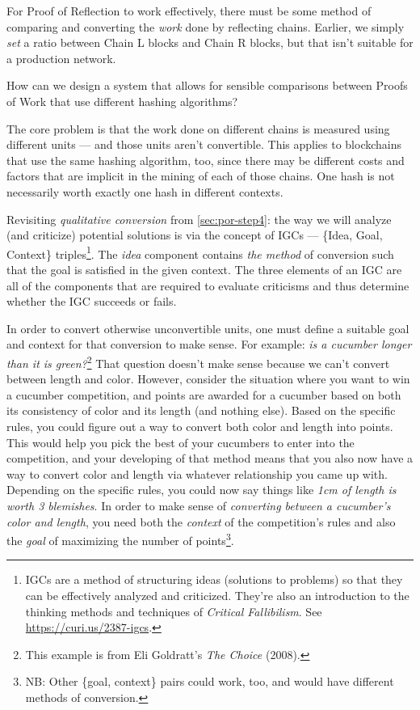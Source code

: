
For Proof of Reflection to work effectively, there must be some method
of comparing and converting the \emph{work} done by reflecting chains.
Earlier, we simply \emph{set} a ratio between Chain L blocks and Chain R
blocks, but that isn't suitable for a production network.

How can we design a system that allows for sensible comparisons between
Proofs of Work that use different hashing algorithms?

The core problem is that the work done on different chains is measured
using different units --- and those units aren't convertible. This
applies to blockchains that use the same hashing algorithm, too, since
there may be different costs and factors that are implicit in the mining
of each of those chains. One hash is not necessarily worth exactly one
hash in different contexts.

Revisiting \emph{qualitative conversion} from \autoref{sec:por-step4}:
the way we will analyze (and criticize) potential solutions is via the
concept of IGCs --- \{Idea, Goal, Context\} triples\footnote{IGCs are a
  method of structuring ideas (solutions to problems) so that they can
  be effectively analyzed and criticized. They're also an introduction
  to the thinking methods and techniques of \emph{Critical Fallibilism}.
  See \url{https://curi.us/2387-igcs}.}. The \emph{idea} component
contains \emph{the method} of conversion such that the goal is
satisfied in the given context. The three elements of an IGC are all of
the components that are required to evaluate criticisms and thus
determine whether the IGC succeeds or fails.

In order to convert otherwise unconvertible units, one must define a
suitable goal and context for that conversion to make sense. For
example: \emph{is a cucumber longer than it is green?}\footnote{This
  example is from Eli Goldratt's \emph{The Choice} (2008).} That
question doesn't make sense because we can't convert between length and
color. However, consider the situation where you want to win a cucumber
competition, and points are awarded for a cucumber based on both its
consistency of color and its length (and nothing else). Based on the
specific rules, you could figure out a way to convert both color and
length into points. This would help you pick the best of your cucumbers
to enter into the competition, and your developing of that method means
that you also now have a way to convert color and length via whatever
relationship you came up with. Depending on the specific rules, you
could now say things like \emph{1cm of length is worth 3 blemishes}. In
order to make sense of \emph{converting between a cucumber's color and
length}, you need both the \emph{context} of the competition's rules and
also the \emph{goal} of maximizing the number of points\footnote{NB:
  Other \{goal, context\} pairs could work, too, and would have
  different methods of conversion.}.

